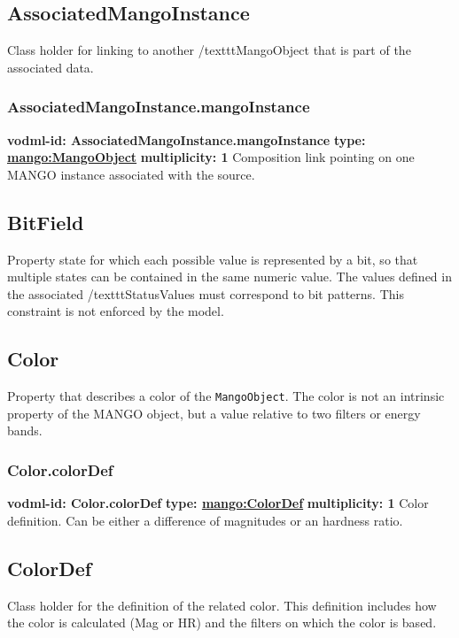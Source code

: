  \subsection{AssociatedMangoInstance}
  \label{sect:AssociatedMangoInstance}
    Class holder for linking to another /texttt{MangoObject} that is part of the associated data.

    \subsubsection{AssociatedMangoInstance.mangoInstance}
      \textbf{vodml-id: AssociatedMangoInstance.mangoInstance} \newline
      \textbf{type: \hyperref[sect:MangoObject]{mango:MangoObject}} \newline
      \textbf{multiplicity: 1} \newline 
      Composition link pointing on one MANGO instance associated with the source.

  \subsection{BitField}
  \label{sect:BitField}
    Property state for which each possible value is represented by a bit, so that multiple states can be contained in the same numeric value. The values defined in the associated /texttt{StatusValues} must correspond to bit patterns. This constraint is not enforced by the model.

  \subsection{Color}
  \label{sect:Color}
    Property that describes a color of the \texttt{MangoObject}. The color is not an intrinsic property of the MANGO object, but a value relative to two filters or energy bands.

    \subsubsection{Color.colorDef}
      \textbf{vodml-id: Color.colorDef} \newline
      \textbf{type: \hyperref[sect:ColorDef]{mango:ColorDef}} \newline
      \textbf{multiplicity: 1} \newline 
      Color definition. Can be either a difference of magnitudes or an hardness ratio.

  \subsection{ColorDef}
  \label{sect:ColorDef}
    Class holder for the definition of the related color. This definition includes how the color is calculated (Mag or HR) and the filters on which the color is based.

